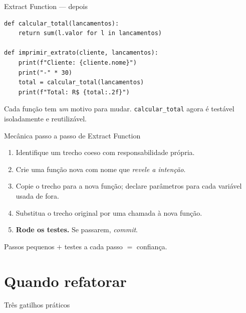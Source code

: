 \documentclass[aspectratio=169]{beamer}
\begin{document}
\begin{frame}[fragile]{Extract Function --- depois}
\begin{lstlisting}
def calcular_total(lancamentos):
    return sum(l.valor for l in lancamentos)

def imprimir_extrato(cliente, lancamentos):
    print(f"Cliente: {cliente.nome}")
    print("-" * 30)
    total = calcular_total(lancamentos)
    print(f"Total: R$ {total:.2f}")
\end{lstlisting}
\small Cada função tem \emph{um} motivo para mudar.
\texttt{calcular\_total} agora é testável isoladamente e reutilizável.
\end{frame}

\begin{frame}{Mecânica passo a passo de Extract Function}
  \begin{enumerate}
    \item Identifique um trecho coeso com responsabilidade própria.
    \item Crie uma função nova com nome que \emph{revele a intenção}.
    \item Copie o trecho para a nova função; declare parâmetros para
              cada variável usada de fora.
    \item Substitua o trecho original por uma chamada à nova função.
    \item \textbf{Rode os testes.} Se passarem, \emph{commit}.
  \end{enumerate}
  \vspace{6pt}
  {\small Passos pequenos $+$ testes a cada passo $=$ confiança.}
\end{frame}

\section{Quando refatorar}

\begin{frame}{Três gatilhos práticos}
  \begin{center}
  \end{center}
\end{frame}
\end{document}
